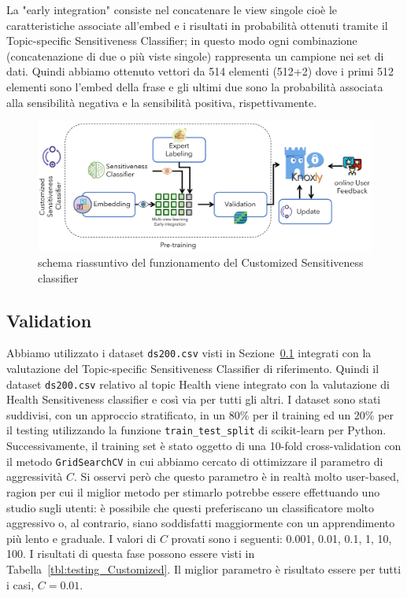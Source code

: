 La "early integration" consiste nel concatenare le view singole cioè le caratteristiche associate all'embed e i risultati in probabilità ottenuti tramite il Topic-specific Sensitiveness Classifier; in questo modo ogni combinazione (concatenazione di due o più viste singole) rappresenta un campione nei set di dati. Quindi abbiamo ottenuto vettori da 514 elementi (512+2) dove i primi 512 elementi sono l'embed della frase e gli ultimi due sono la probabilità associata alla sensibilità negativa e la sensibilità positiva, rispettivamente.

\begin{figure}[h]
    \centering
    \includegraphics[width=15cm]{Figure/grafici/customized_cropped.pdf}
    \caption{schema riassuntivo del funzionamento del Customized Sensitiveness classifier}
    \label{fig:approccisensCustomized}
\end{figure}
\FloatBarrier

\subsection{Validation}
Abbiamo utilizzato i dataset {\tt ds200.csv} visti in Sezione~\ref{} integrati con la valutazione del Topic-specific Sensitiveness Classifier di riferimento. Quindi il dataset {\tt ds200.csv} relativo al topic Health viene integrato con la valutazione di Health Sensitiveness classifier e così via per tutti gli altri.
I dataset sono stati suddivisi, con un approccio stratificato, in un 80\% per il training ed un 20\% per il testing utilizzando la funzione {\tt train\_test\_split} di scikit-learn per Python. Successivamente, il training set è stato oggetto di una 10-fold cross-validation con il metodo {\tt GridSearchCV} in cui abbiamo cercato di ottimizzare il parametro di aggressività $C$. Si osservi però che questo parametro è in realtà molto user-based, ragion per cui il miglior metodo per stimarlo potrebbe essere effettuando uno studio sugli utenti: è possibile che questi preferiscano un classificatore molto aggressivo o, al contrario, siano soddisfatti maggiormente con un apprendimento più lento e graduale. I valori di $C$ provati sono i seguenti: 0.001, 0.01, 0.1, 1, 10, 100. I risultati di questa fase possono essere visti in Tabella~\ref{tbl:testing_Customized}. Il miglior parametro è risultato essere per tutti i casi, $C=0.01$.

